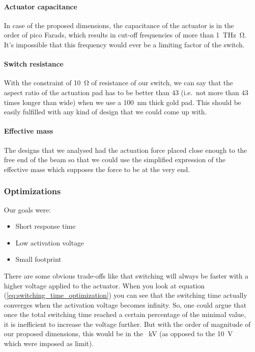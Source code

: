 \paragraph{Actuator capacitance}
In case of the proposed dimensions, the capacitance of the actuator is in the order of pico Farads, which results in cut-off frequencies of more than \SI{1}{\tera\hertz\ohm}.
It's impossible that this frequency would ever be a limiting factor of the switch.

\paragraph{Switch resistance}
With the constraint of \SI{10}{\ohm} of resistance of our switch, we can say that the aspect ratio of the actuation pad has to be better than $43$ (i.e.\ not more than $43$ times longer than wide) when we use a \SI{100}{\nano\meter} thick gold pad.
This should be easily fulfilled with any kind of design that we could come up with.

\paragraph{Effective mass}
The designs that we analysed had the actuation force placed close enough to the free end of the beam so that we could use the simplified expression of the effective mass which supposes the force to be at the very end.


\subsubsection{Optimizations}
\label{ssub:optimizations}

Our goals were:

\begin{itemize}
    \item Short response time
    \item Low activation voltage
    \item Small footprint
\end{itemize}

There are some obvious trade-offs like that switching will always be faster with a higher voltage applied to the actuator.
When you look at equation (\ref{eq:switching_time_optimization}) you can see that the switching time actually converges when the activation voltage becomes infinity.
So, one could argue that once the total switching time reached a certain percentage of the minimal value, it is inefficient to increase the voltage further.
But with the order of magnitude of our proposed dimensions, this would be in the \SI{}{\kilo\volt} (as opposed to the \SI{10}{\volt} which were imposed as limit).

